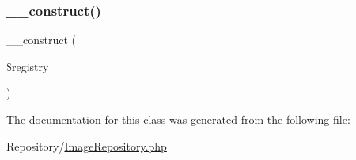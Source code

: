 \subsubsection{\texorpdfstring{\_\_construct()}{\_\_construct()}}
{\footnotesize\ttfamily \+\_\+\+\_\+construct (\begin{DoxyParamCaption}\item[{Registry\+Interface}]{\$registry }\end{DoxyParamCaption})}



The documentation for this class was generated from the following file\+:\begin{DoxyCompactItemize}
\item 
Repository/\mbox{\hyperlink{_image_repository_8php}{Image\+Repository.\+php}}\end{DoxyCompactItemize}
